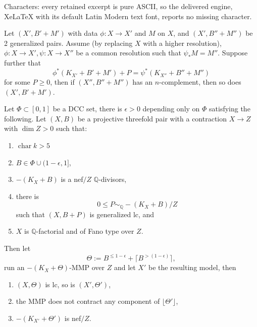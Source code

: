 \documentclass[10pt,a4paper]{amsart}
\DeclareMathOperator{\chara}{char}
\begin{document}
Characters: every retained excerpt is pure ASCII, so the delivered engine, XeLaTeX with its default Latin Modern text font, reports no missing character.
    \begin{lemma}
    \label{subcrep}
        Let $(X',B' + M')$ with data $\phi:X\to X'$ and $M$ on $X$, and $(X',B'' + M'')$ be 2 generalized pairs. Assume (by replacing $X$ with a higher resolution), $\phi:X\to X',\psi:X\to X''$ be a common resolution such that $\psi_*M = M''$. Suppose further that \[\phi^*(K_{X'} + B' +M') + P = \psi^*(K_{X''} + B'' +M'')\] for some $P \geq 0$, then if $(X'',B'' +M'')$ has an $n$-complement, then so does $(X',B' +M')$.
    \end{lemma}

\begin{proposition}
\label{coe1}
    Let $\Phi\subset[0,1]$ be a DCC set, there is $\epsilon>0$ depending only on $\Phi$ satisfying the following. Let $(X,B)$ be a projective threefold pair with a contraction $X\to Z$ with $\dim Z>0$ such that:
    \begin{enumerate}
    \item $\chara k>5$
        \item $B\in\Phi\cup(1-\epsilon,1]$,
        \item $-(K_X+B)$ is a nef$/Z$ ${\mathbb Q}$-divisors,
        \item there is 
        \[0\leq P\sim_{\mathbb Q}-(K_X+B)/Z\]
        such that $(X, B+P)$ is generalized lc, and 
        \item $X$ is ${\mathbb Q}$-factorial and of Fano type over $Z$.
    \end{enumerate}
    Then let
    \[\Theta:=B^{\leq 1-\epsilon}+\lceil B^{>(1-\epsilon)}\rceil,\] run an $-(K_X+\Theta)$-MMP  over $Z$ and let $X'$ be the resulting model, then
    \begin{enumerate}
        \item $(X,\Theta)$ is lc, so is $(X',\Theta')$,
        \item the MMP does not contract any component of $\lfloor\Theta'\rfloor$,
        \item $-(K_{X'}+\Theta')$ is nef$/Z$.
    \end{enumerate}
\end{proposition}
\end{document}
